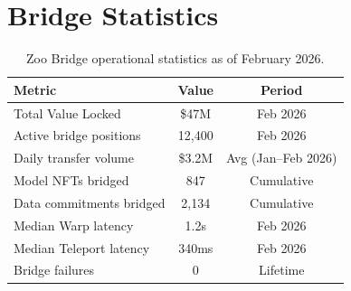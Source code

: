 \section{Bridge Statistics}


\begin{table}[t]
\centering
\begin{tabular}{lcc}
\toprule
\textbf{Metric} & \textbf{Value} & \textbf{Period} \\
\midrule
Total Value Locked & \$47M & Feb 2026 \\
Active bridge positions & 12,400 & Feb 2026 \\
Daily transfer volume & \$3.2M & Avg (Jan--Feb 2026) \\
Model NFTs bridged & 847 & Cumulative \\
Data commitments bridged & 2,134 & Cumulative \\
Median Warp latency & 1.2s & Feb 2026 \\
Median Teleport latency & 340ms & Feb 2026 \\
Bridge failures & 0 & Lifetime \\
\bottomrule
\end{tabular}
\caption{Zoo Bridge operational statistics as of February 2026.}
\label{tab:stats}
\end{table}

